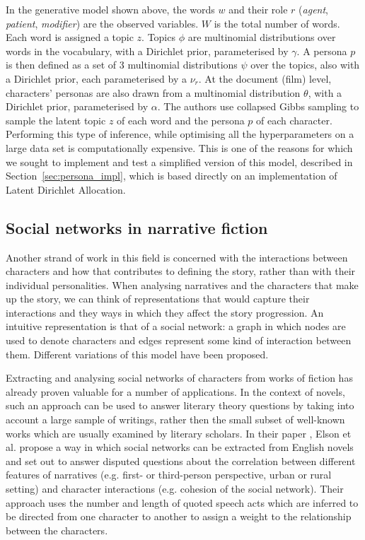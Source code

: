 \documentclass[bsc,frontabs,singlespacing,parskip, twoside]{infthesis}
\begin{document}
In the generative model shown above, the words $w$ and their role $r$ (\textit{agent}, \textit{patient}, \textit{modifier}) are the observed variables. $W$ is the total number of words. Each word is assigned a topic $z$. Topics $\phi$ are multinomial distributions over words in the vocabulary, with a Dirichlet prior, parameterised by $\gamma$. A persona $p$ is then defined as a set of 3 multinomial distributions $\psi$ over the topics, also with a Dirichlet prior, each parameterised by a $\nu_r$. At the document (film) level, characters' personas are also drawn from a multinomial distribution $\theta$, with a Dirichlet prior, parameterised by $\alpha$. The authors use collapsed Gibbs sampling \cite{griffiths2004finding} to sample the latent topic $z$ of each word and the persona $p$ of each character. Performing this type of inference, while optimising all the hyperparameters on a large data set is computationally expensive. This is one of the reasons for which we sought to implement and test a simplified version of this model, described in Section~\ref{sec:persona_impl}, which is based directly on an implementation of Latent Dirichlet Allocation.

\subsection{Social networks in narrative fiction}
Another strand of work in this field is concerned with the interactions between characters and how that contributes to defining the story, rather than with their individual personalities. When analysing narratives and the characters that make up the story, we can think of representations that would capture their interactions and they ways in which they affect the story progression. An intuitive representation is that of a social network: a graph in which nodes are used to denote characters and edges represent some kind of interaction between them. Different variations of this model have been proposed.

Extracting and analysing social networks of characters from works of fiction has already proven valuable for a number of applications. In the context of novels, such an approach can be used to answer literary theory questions by taking into account a large sample of writings, rather then the small subset of well-known works which are usually examined by literary scholars. In their paper \cite{Elson2010}, Elson et al. propose a way in which social networks can be extracted from English novels and set out to answer disputed questions about the correlation between different features of narratives (e.g. first- or third-person perspective, urban or rural setting) and character interactions (e.g. cohesion of the social network). Their approach uses the number and length of quoted speech acts which are inferred to be directed from one character to another to assign a weight to the relationship between the characters.
\end{document}
